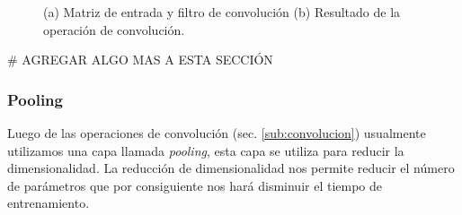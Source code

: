\begin{figure}[htbp]
\centering
{}%

\caption{(a) Matriz de entrada y filtro de convolución (b) Resultado de la operación de convolución.}\label{Fig:filter}
\end{figure}

# AGREGAR ALGO MAS A ESTA SECCIÓN


\subsubsection{Pooling}\label{sub:pooling}

Luego de las operaciones de convolución (sec. \ref{sub:convolucion}) usualmente utilizamos una capa llamada \textit{pooling}, esta capa se utiliza para reducir la dimensionalidad. La reducción de dimensionalidad nos permite reducir el número de parámetros que por consiguiente nos hará disminuir el tiempo de entrenamiento.

